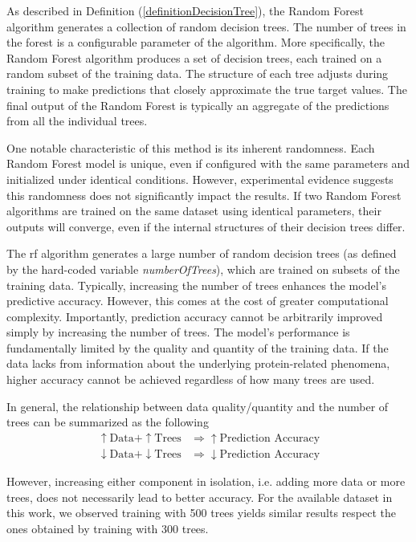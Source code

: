 \documentclass[11pt]{article}
\begin{document}
As described in Definition (\ref{definitionDecisionTree}), the Random Forest algorithm generates a collection of random decision trees. The number of trees in the forest is a configurable parameter of the algorithm. More specifically, the Random Forest algorithm produces a set of decision trees, each trained on a random subset of the training data. The structure of each tree adjusts during training to make predictions that closely approximate the true target values. The final output of the Random Forest is typically an aggregate of the predictions from all the individual trees.\par

One notable characteristic of this method is its inherent randomness. Each Random Forest model is unique, even if configured with the same parameters and initialized under identical conditions. However, experimental evidence suggests this randomness does not significantly impact the results. If two Random Forest algorithms are trained on the same dataset using identical parameters, their outputs will converge, even if the internal structures of their decision trees differ.

The \gls{rf} algorithm generates a large number of random decision trees (as defined by the hard-coded variable \emph{numberOfTrees}), which are trained on subsets of the training data. Typically, increasing the number of trees enhances the model’s predictive accuracy. However, this comes at the cost of greater computational complexity. Importantly, prediction accuracy cannot be arbitrarily improved simply by increasing the number of trees. The model’s performance is fundamentally limited by the quality and quantity of the training data. If the data lacks from information about the underlying protein-related phenomena, higher accuracy cannot be achieved regardless of how many trees are used.

In general, the relationship between data quality/quantity and the number of trees can be summarized as the following
\begin{align*}
\uparrow\text{Data} + \uparrow\text{Trees} &\Rightarrow \uparrow\text{Prediction Accuracy} \\
\downarrow\text{Data} + \downarrow\text{Trees} &\Rightarrow \downarrow\text{Prediction Accuracy}
\end{align*}

However, increasing either component in isolation, i.e. adding more data or more trees, does not necessarily lead to better accuracy. For the available dataset in this work, we observed training with 500 trees yields similar results respect the ones obtained by training with 300 trees.
\end{document}
